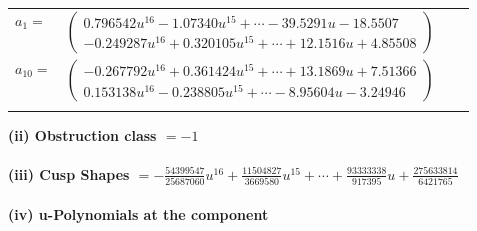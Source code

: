 \documentclass[1p]{elsarticle_modified}
\theoremstyle{definition}
\begin{document}
\begin{tabular}{m{7pt} m{180pt} m{7pt} m{180pt} }
\flushright $a_{1}=$&$\begin{pmatrix}0.796542 u^{16}-1.07340 u^{15}+\cdots-39.5291 u-18.5507\\-0.249287 u^{16}+0.320105 u^{15}+\cdots+12.1516 u+4.85508\end{pmatrix}$ \\
\flushright $a_{10}=$&$\begin{pmatrix}-0.267792 u^{16}+0.361424 u^{15}+\cdots+13.1869 u+7.51366\\0.153138 u^{16}-0.238805 u^{15}+\cdots-8.95604 u-3.24946\end{pmatrix}$\\&\end{tabular}
\flushleft \textbf{(ii) Obstruction class $= -1$}\\~\\
\flushleft \textbf{(iii) Cusp Shapes $= -\frac{54399547}{25687060} u^{16}+\frac{11504827}{3669580} u^{15}+\cdots+\frac{93333338}{917395} u+\frac{275633814}{6421765}$}\\~\\
\newpage\renewcommand{\arraystretch}{1}
\flushleft \textbf{(iv) u-Polynomials at the component}\newline \\
\end{document}
